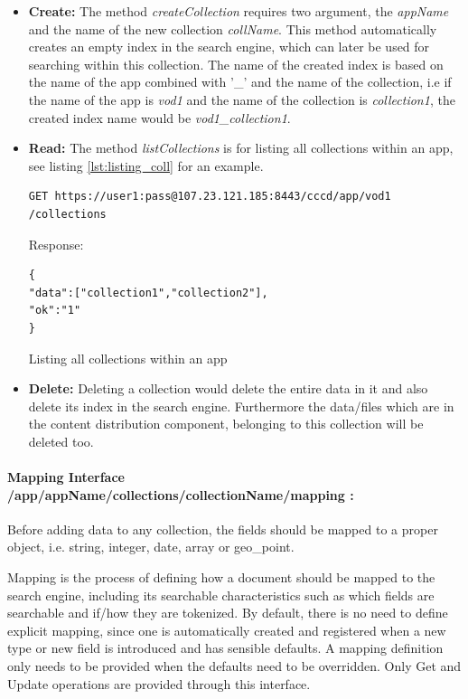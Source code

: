 \begin{itemize}
\item \textbf{Create:} The method \textit{createCollection} requires two argument, the \textit{appName} and the name of the new collection \textit{collName}. This method automatically creates an empty index in the search engine, which can later be used for searching within this collection. The name of the created index is based on the name of the app combined with '\_' and the name of the collection, i.e if the name of the app is \textit{vod1} and the name of the collection is \textit{collection1}, the created index name would be \textit{vod1\_collection1}.

\item \textbf{Read:} The method \textit{listCollections} is for listing all collections within an app, see listing \ref{lst:listing_coll} for an example.

\begin{code}
\begin{verbatim}
GET https://user1:pass@107.23.121.185:8443/cccd/app/vod1
/collections
\end{verbatim}
Response:
\begin{verbatim}
{
"data":["collection1","collection2"],
"ok":"1"
}
\end{verbatim}
\caption{Listing all collections within an app}
\label{lst:listing_coll}
\end{code}

\item \textbf{Delete:} Deleting a collection would delete the entire data in it and also delete its index in the search engine. Furthermore the data/files which are in the content distribution component, belonging to this collection will be deleted too.
\end{itemize}

\paragraph{Mapping Interface /app/{appName}/collections/{collectionName}/mapping :\label{sec:des_rest_api_mapping}} Before adding data to any collection, the fields should be mapped to a proper object, i.e. string, integer, date, array or geo\_point. 

Mapping is the process of defining how a document should be mapped to the search engine, including its searchable characteristics such as which fields are searchable and if/how they are tokenized.  By default, there is no need to define explicit mapping, since one is automatically created and registered when a new type or new field is introduced and has sensible defaults. A mapping definition only needs to be provided when the defaults need to be overridden. Only Get and Update operations are provided through this interface.
 
